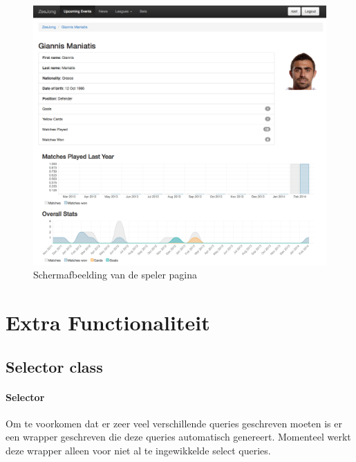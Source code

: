 \documentclass[11pt]{article}
\begin{document}
\begin{figure}[h!]
	\begin{center}
	\includegraphics[scale=0.29]{player.png}

	\caption{Schermafbeelding van de speler pagina}
	\label{fig:speler}
	\end{center}
\end{figure}




\section{Extra Functionaliteit}


\subsection{Selector class}




\paragraph{Selector}

Om te voorkomen dat er zeer veel verschillende queries geschreven moeten is er een wrapper geschreven die
deze queries automatisch genereert. Momenteel werkt deze wrapper alleen voor niet al te ingewikkelde select queries.
\end{document}
